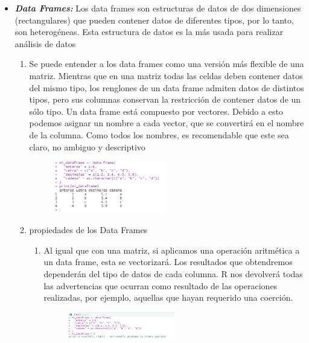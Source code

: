 \documentclass{article}
\begin{document}
\begin{itemize}
\item \textbf{\textit{Data Frames: }} 
    Los data frames son estructuras de datos de dos dimensiones
    (rectangulares) que pueden contener datos de diferentes tipos, por lo tanto, son heterogéneas. Esta estructura de datos es la más usada para realizar análisis de datos
    \begin{enumerate}
            \item Se puede entender a los data frames como una versión más flexible de una matriz. Mientras que en una matriz todas las celdas deben contener datos del mismo tipo, los renglones de un data frame admiten datos de distintos tipos, pero sus columnas conservan la restricción de contener datos de un sólo tipo.
             Un data frame está compuesto por vectores. Debido a esto podemos asignar un nombre a cada vector, que se convertirá en el nombre de la columna. Como todos los nombres, es recomendable que este sea claro, no ambiguo y descriptivo
            \begin{figure}[H]
            \centering
            \includegraphics[width=0.5\textwidth]{imagenes/ejemplo8.jpg}
            \caption{\label{fig20}}
        \end{figure}
        
            
            \item propiedades de los Data Frames
            \begin{enumerate}
                \item Al igual que con una matriz, si aplicamos una operación aritmética a un data frame, esta se vectorizará. Los resultados que obtendremos dependerán del tipo de datos de cada columna. R nos devolverá todas las advertencias que ocurran como resultado de las operaciones realizadas, por ejemplo, aquellas que hayan requerido una coerción. 
                \begin{figure}[H]
            \centering
            \includegraphics[width=0.5\textwidth]{imagenes/ejemplo7.jpg}
            \caption{\label{fig21}}
        \end{figure}
        
              
            \end{enumerate}
        \end{enumerate}
\end{itemize}
\end{document}
